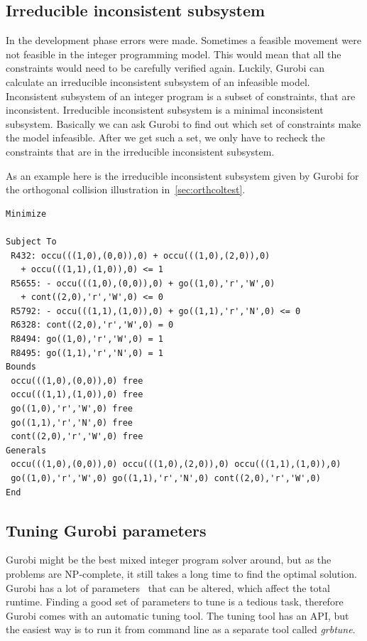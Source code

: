 \subsection{Irreducible inconsistent subsystem}
In the development phase errors were made. Sometimes a feasible movement were
not feasible in the integer programming model. This would mean that all the
constraints would need to be carefully verified again. Luckily, Gurobi can
calculate an irreducible inconsistent subsystem of an infeasible model.
Inconsistent subsystem of an integer program is a subset of constraints, that
are inconsistent. Irreducible inconsistent subsystem is a minimal
inconsistent subsystem. Basically we can ask Gurobi to find out which set of
constraints make the model infeasible. After we get such a set, we only have to
recheck the constraints that are in the irreducible inconsistent subsystem.

As an example here is the irreducible inconsistent subsystem given by Gurobi
for the orthogonal collision illustration in~\autoref{sec:orthcoltest}.
\begin{verbatim}
Minimize
 
Subject To
 R432: occu(((1,0),(0,0)),0) + occu(((1,0),(2,0)),0)
   + occu(((1,1),(1,0)),0) <= 1
 R5655: - occu(((1,0),(0,0)),0) + go((1,0),'r','W',0)
   + cont((2,0),'r','W',0) <= 0
 R5792: - occu(((1,1),(1,0)),0) + go((1,1),'r','N',0) <= 0
 R6328: cont((2,0),'r','W',0) = 0
 R8494: go((1,0),'r','W',0) = 1
 R8495: go((1,1),'r','N',0) = 1
Bounds
 occu(((1,0),(0,0)),0) free
 occu(((1,1),(1,0)),0) free
 go((1,0),'r','W',0) free
 go((1,1),'r','N',0) free
 cont((2,0),'r','W',0) free
Generals
 occu(((1,0),(0,0)),0) occu(((1,0),(2,0)),0) occu(((1,1),(1,0)),0)
 go((1,0),'r','W',0) go((1,1),'r','N',0) cont((2,0),'r','W',0)
End
\end{verbatim}
\subsection{Tuning Gurobi parameters}
Gurobi might be the best mixed integer program solver around, but as the
problems are NP-complete, it still takes a long time to find the optimal
solution. Gurobi has a lot of parameters~\cite{gurobiparams} that can be
altered, which affect the total runtime. Finding a good set of parameters to
tune is a tedious task, therefore Gurobi comes with an automatic tuning tool.
The tuning tool has an API, but the easiest way is to run it from command line
as a separate tool called \textit{grbtune}.

